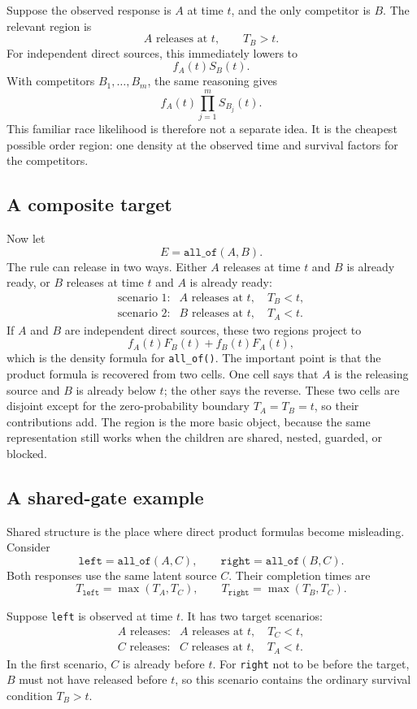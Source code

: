 \documentclass[11pt]{article}
\begin{document}
Suppose the observed response is $A$ at time $t$, and the only competitor is
$B$. The relevant region is
\[
\text{$A$ releases at $t$}, \qquad T_B > t.
\]
For independent direct sources, this immediately lowers to
\[
f_A(t)S_B(t).
\]
With competitors $B_1,\dots,B_m$, the same reasoning gives
\[
f_A(t)\prod_{j=1}^m S_{B_j}(t).
\]
This familiar race likelihood is therefore not a separate idea. It is the
cheapest possible order region: one density at the observed time and survival
factors for the competitors.

\subsection{A composite target}

Now let
\[
E = \texttt{all\_of}(A,B).
\]
The rule can release in two ways. Either $A$ releases at time $t$ and $B$ is
already ready, or $B$ releases at time $t$ and $A$ is already ready:
\[
\begin{array}{ll}
\text{scenario 1:} & \text{$A$ releases at $t$}, \quad T_B < t,\\[2mm]
\text{scenario 2:} & \text{$B$ releases at $t$}, \quad T_A < t.
\end{array}
\]
If $A$ and $B$ are independent direct sources, these two regions project to
\[
f_A(t)F_B(t) + f_B(t)F_A(t),
\]
which is the density formula for \texttt{all\_of()}. The important point is
that the product formula is recovered from two cells. One cell says that $A$ is
the releasing source and $B$ is already below $t$; the other says the reverse.
These two cells are disjoint except for the zero-probability boundary
$T_A=T_B=t$, so their contributions add. The region is the more basic object,
because the same representation still works when the children are shared,
nested, guarded, or blocked.

\subsection{A shared-gate example}

Shared structure is the place where direct product formulas become misleading.
Consider
\[
\texttt{left} = \texttt{all\_of}(A,C),
\qquad
\texttt{right} = \texttt{all\_of}(B,C).
\]
Both responses use the same latent source $C$. Their completion times are
\[
T_{\texttt{left}} = \max(T_A,T_C),
\qquad
T_{\texttt{right}} = \max(T_B,T_C).
\]

Suppose \texttt{left} is observed at time $t$. It has two target scenarios:
\[
\begin{array}{ll}
\text{$A$ releases:} & \text{$A$ releases at $t$}, \quad T_C < t,\\[2mm]
\text{$C$ releases:} & \text{$C$ releases at $t$}, \quad T_A < t.
\end{array}
\]
In the first scenario, $C$ is already before $t$. For \texttt{right} not to be
before the target, $B$ must not have released before $t$, so this scenario
contains the ordinary survival condition $T_B > t$.
\end{document}
